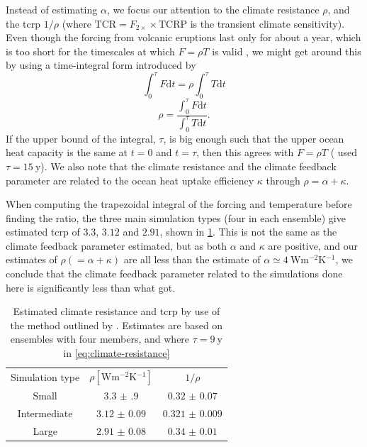 \documentclass{ametsocV5}
\begin{document}
Instead of estimating \(\alpha \), we focus our attention to the climate resistance
\(\rho \), and the \acrfull{tcrp} \(1/\rho\) (where \(\mathrm{TCR}=F_{2\times}\times
\mathrm{TCRP}\) is the transient climate sensitivity). Even though the forcing from
volcanic eruptions last only for about a year, which is too short for the timescales at
which \(F=\rho T\) is valid \citep{gregory2016}, we might get around this by using a
time-integral form introduced by \citet{merlis2014}
\begin{equation}
  \int_0^{\tau}F \mathrm{d}t=\rho\int_{0}^{\tau}T \mathrm{d}t
\end{equation}
\begin{equation}
  \rho=\frac{\int_0^{\tau}F \mathrm{d}t}{\int_{0}^{\tau}T \mathrm{d}t}.
  \label{eq:climate-resistance}
\end{equation}
%
If the upper bound of the integral, \(\tau \), is big enough such that the upper ocean
heat capacity is the same at \(t=0\) and \(t=\tau \), then this agrees with \(F=\rho T\)
\citep{gregory2016} (\citet{merlis2014} used \(\tau =\SI{15}{\mathrm{y}}\)). We also
note that the climate resistance and the climate feedback parameter are related to the
ocean heat uptake efficiency \(\kappa \) through \(\rho =\alpha +\kappa \).

When computing the trapezoidal integral of the forcing and temperature before finding
the ratio, the three main simulation types (four in each ensemble) give estimated
\acrshort{tcrp} of \(3.3\), \(3.12\) and \(2.91\), shown in \cref{tab:trcp}. This is not
the same as the climate feedback parameter \citet{jones2005} estimated, but as both
\(\alpha \) and \(\kappa \) are positive, and our estimates of \(\rho (=\alpha +\kappa)
\) are all less than the \citet{jones2005} estimate of \(\alpha \simeq
\SI{4}{\watt\metre^{-2}\kelvin^{-1}}\), we conclude that the climate feedback parameter
related to the simulations done here is significantly less than what \citet{jones2005}
got.

\begin{table}
  \centering
  \caption{Estimated climate resistance and \acrshort{tcrp} by use of the method outlined by
    \citet{merlis2014}. Estimates are based on ensembles with four members, and where
    \(\tau =\SI{9}{\mathrm{y}}\) in \cref{eq:climate-resistance}}%
  \label{tab:trcp}
  \begin{tabular}{ccc}
    Simulation type & \(\rho [\si{\watt\metre^{-2}\kelvin^{-1}}]\) & \(1/\rho\)         \\
    Small           & \(\num{3.3(9)}\)                             & \(\num{0.32(7)}\)  \\
    Intermediate    & \(\num{3.12(9)}\)                            & \(\num{0.321(9)}\) \\
    Large           & \(\num{2.91(8)}\)                            & \(\num{0.34(1)}\)  \\
  \end{tabular}
\end{table}
\end{document}
